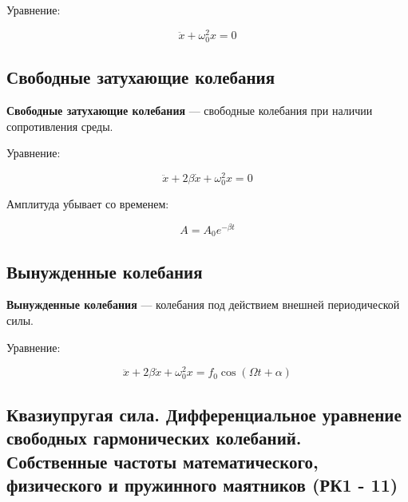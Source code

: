 \documentclass[a4paper,12pt]{article}
\begin{document}
Уравнение:

\[
\ddot x+\omega_0^2 x=0
\]

\vspace{0.8em}

\subsection*{Свободные затухающие колебания}

\begin{definitionbox}
\textbf{Свободные затухающие колебания} — свободные колебания при наличии сопротивления среды.
\end{definitionbox}

Уравнение:

\[
\ddot x+2\beta \dot x+\omega_0^2 x=0
\]

Амплитуда убывает со временем:

\[
A=A_0 e^{-\beta t}
\]

\vspace{0.8em}

\subsection*{Вынужденные колебания}

\begin{definitionbox}
\textbf{Вынужденные колебания} — колебания под действием внешней периодической силы.
\end{definitionbox}

Уравнение:

\[
\ddot x+2\beta \dot x+\omega_0^2 x
=
f_0\cos(\Omega t+\alpha)
\] 
\subsection[
Квазиупругая сила. Дифференциальное уравнение свободных гармонических колебаний. Собственные частоты математического, физического и пружинного маятников (РК1 - 11)
]{
Квазиупругая сила. Дифференциальное уравнение свободных гармонических колебаний.\\
Собственные частоты математического, физического и пружинного маятников (РК1 - 11)
}
\end{document}
